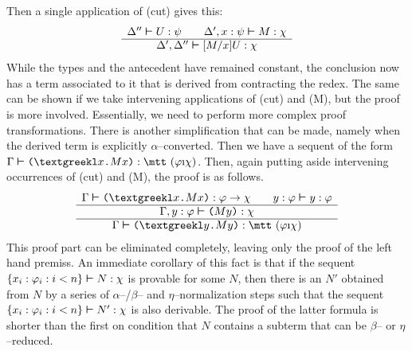 Then a single application of (cut) gives this:
\begin{equation}
\begin{array}{c}
\Delta'' \boldsymbol{\vdash} U : \psi \qquad \Delta', x : \psi \boldsymbol{\vdash}
    M : \chi \\\hline
\Delta', \Delta'' \boldsymbol{\vdash} [M/x]U : \chi
\end{array}
\end{equation}
While the types and the antecedent have remained constant, the
conclusion now has a term associated to it that is derived from
contracting the redex. The same can be shown if we take
intervening applications of (cut) and (M), but the proof is more
involved. Essentially, we need to perform more complex proof
transformations. There is another simplification that can be made,
namely when the derived term is explicitly $\alpha$--converted.
Then we have a sequent of the form $\Gamma \bvdash \mbox{\tt (%
\stlambda} x\mbox{\tt .}Mx\mbox{\tt )} : \mbox{\mtt ($\varphi$%
\symbol{25}$\chi$)}$. Then, again putting aside intervening 
occurrences of (cut) and (M), the proof is as follows.
\begin{equation}
\begin{array}{c}
\Gamma \bvdash \mbox{\tt (\stlambda} x\mbox{\tt .}Mx\mbox{\tt )}
    : \varphi\pf\chi  \qquad y : \varphi \bvdash y : \varphi \\\hline
\Gamma, y : \varphi \bvdash \mbox{\tt (}My\mbox{\tt )} : \chi
\\\hline \Gamma \bvdash \mbox{\tt (\stlambda} y\mbox{\tt
.}My\mbox{\tt )} : \mbox{\mtt ($\varphi$\symbol{25}$\chi$)}
\end{array}
\end{equation}
This proof part can be eliminated completely, leaving only the
proof of the left hand premiss. An immediate corollary of this
fact is that if the sequent 
$\{x_i : \varphi_i : i < n\} \boldsymbol{\vdash} N : \chi$ is
provable for some $N$, then there is an $N'$ obtained from $N$ by
a series of $\alpha$--/$\beta$-- and $\eta$--normalization steps
such that the sequent $\{x_i : \varphi_i : i < n\} \boldsymbol{\vdash} N' : \chi$ 
is also derivable. The proof of the latter formula is shorter than the
first on condition that $N$ contains a subterm that can be
$\beta$-- or $\eta$--reduced.

